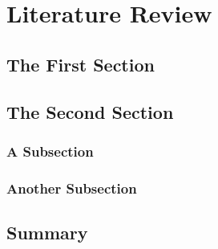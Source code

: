 
\chapter{Literature Review}
\label{chap:lit_review}





\section{The First Section}
\label{sec:second:first_sec}


\section{The Second Section}
\label{sec:second:second_sec}


\subsection{A Subsection}
\label{sec:second:second_sec:one}


\subsection{Another Subsection}
\label{sec:second:second_sec:two}


\section{Summary}
\label{sec:second:summary}

